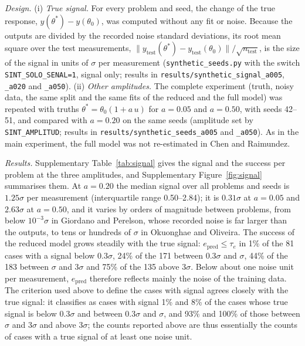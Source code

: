\emph{Design.} (i) \emph{True signal.} For every problem and seed, the change of the true response, $y(\theta^\ast)-y(\theta_0)$, was computed without any fit or noise. Because the outputs are divided by the recorded noise standard deviations, its root mean square over the test measurements, $\|y_{\mathrm{test}}(\theta^\ast)-y_{\mathrm{test}}(\theta_0)\|/\sqrt{n_{\mathrm{test}}}$, is the size of the signal in units of $\sigma$ per measurement (\texttt{synthetic\_seeds.py} with the switch \texttt{SINT\_SOLO\_SENAL=1}, signal only; results in \texttt{results/synthetic\_signal\_a005}, \texttt{\_a020} and \texttt{\_a050}). (ii) \emph{Other amplitudes.} The complete experiment (truth, noisy data, the same split and the same fits of the reduced and the full model) was repeated with truths $\theta^\ast=\theta_0(1+a\,u)$ for $a=0.05$ and $a=0.50$, with seeds 42--51, and compared with $a=0.20$ on the same seeds (amplitude set by \texttt{SINT\_AMPLITUD}; results in \texttt{results/synthetic\_seeds\_a005} and \texttt{\_a050}). As in the main experiment, the full model was not re-estimated in Chen and Raimundez.

\emph{Results.} Supplementary Table~\ref{tab:signal} gives the signal and the success per problem at the three amplitudes, and Supplementary Figure~\ref{fig:signal} summarises them. At $a=0.20$ the median signal over all problems and seeds is $1.25\sigma$ per measurement (interquartile range 0.50--2.84); it is $0.31\sigma$ at $a=0.05$ and $2.63\sigma$ at $a=0.50$, and it varies by orders of magnitude between problems, from below $10^{-3}\sigma$ in Giordano and Perelson, whose recorded noise is far larger than the outputs, to tens or hundreds of $\sigma$ in Okuonghae and Oliveira. The success of the reduced model grows steadily with the true signal: $e_{\mathrm{pred}}\le\tau_e$ in 1\% of the 81 cases with a signal below $0.3\sigma$, 24\% of the 171 between $0.3\sigma$ and $\sigma$, 44\% of the 183 between $\sigma$ and $3\sigma$ and 75\% of the 135 above $3\sigma$. Below about one noise unit per measurement, $e_{\mathrm{pred}}$ therefore reflects mainly the noise of the training data. The criterion used above to define the cases with signal agrees closely with the true signal: it classifies as cases with signal 1\% and 8\% of the cases whose true signal is below $0.3\sigma$ and between $0.3\sigma$ and $\sigma$, and 93\% and 100\% of those between $\sigma$ and $3\sigma$ and above $3\sigma$; the counts reported above are thus essentially the counts of cases with a true signal of at least one noise unit.


